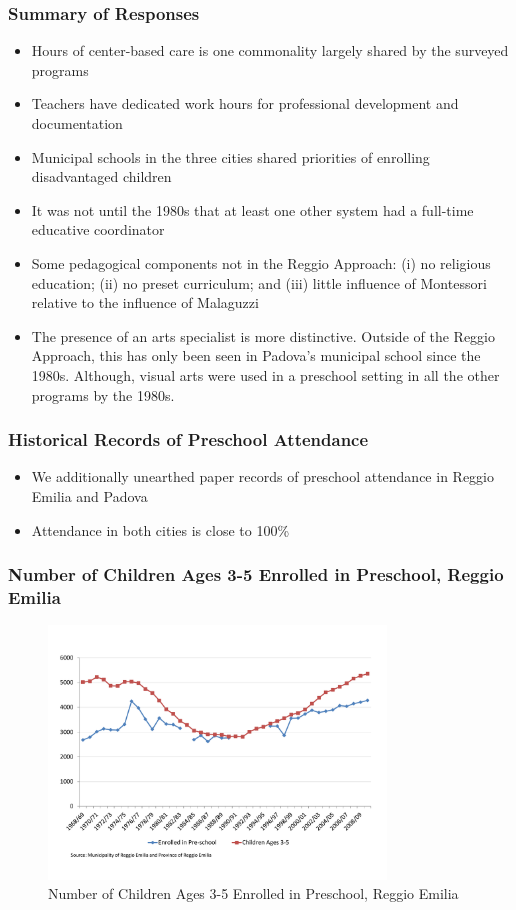 \documentclass[static]{JJH-Beamer_PAGENOS}
\begin{document}
\begin{frame}
\frametitle{Summary of Responses}
\footnotesize
\begin{itemize}
	\item Hours of center-based care is one commonality largely shared by the surveyed programs
	\item Teachers have dedicated work hours for professional development and documentation
	\item Municipal schools in the three cities shared priorities of enrolling disadvantaged children
	\item It was not until the 1980s that at least one other system had a full-time educative coordinator
	\item Some pedagogical components not in the Reggio Approach: (i) no religious education; (ii) no preset curriculum; and (iii) little influence of Montessori relative to the influence of Malaguzzi
	\item The presence of an arts specialist is more distinctive. Outside of the Reggio Approach, this has only been seen in Padova's municipal school since the 1980s. Although, visual arts were used in a preschool setting in all the other programs by the 1980s.  
\end{itemize}
\end{frame}

\begin{frame}
\frametitle{Historical Records of Preschool Attendance}
\begin{itemize}
	\item We additionally unearthed paper records of preschool attendance in Reggio Emilia and Padova
	\item Attendance in both cities is close to 100\% 
\end{itemize}
\end{frame}

\begin{frame}
\frametitle{Number of Children Ages 3-5 Enrolled in Preschool, Reggio Emilia}
\centering
\begin{figure}[H]
\caption{Number of Children Ages 3-5 Enrolled in Preschool, Reggio Emilia}
\includegraphics[width=0.8\textwidth]{../../output/image/Enrollement_Preschool_RE.pdf}
\end{figure}
\end{frame}
\end{document}
